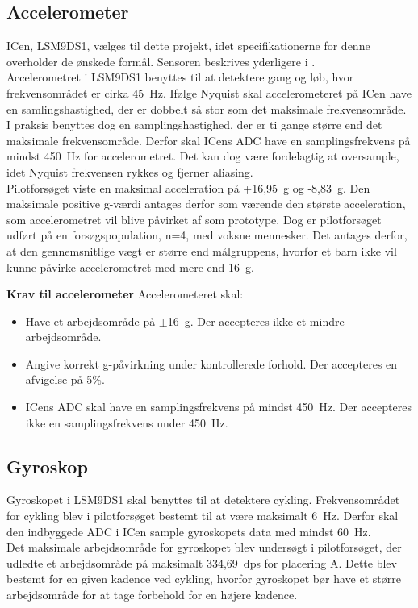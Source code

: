 \subsection{Accelerometer}\label{krav:acc}
ICen, LSM9DS1, vælges til dette projekt, idet specifikationerne for denne overholder de ønskede formål. Sensoren beskrives yderligere i . \\
Accelerometret i LSM9DS1 benyttes til at detektere gang og løb, hvor frekvensområdet er cirka 45~Hz. Ifølge Nyquist skal accelerometeret på ICen have en samlingshastighed, der er dobbelt så stor som det maksimale frekvensområde. I praksis benyttes dog en samplingshastighed, der er ti gange større end det maksimale frekvensområde. Derfor skal ICens ADC have en samplingsfrekvens på mindst 450~Hz for accelerometret. Det kan dog være fordelagtig at oversample, idet Nyquist frekvensen rykkes og fjerner aliasing.~\citep{Webster2011} \\
Pilotforsøget viste en maksimal acceleration på +16,95~g og -8,83~g. Den maksimale positive g-værdi antages derfor som værende den største acceleration, som accelerometret vil blive påvirket af som prototype. Dog er pilotforsøget udført på en forsøgspopulation, n=4, med voksne mennesker. Det antages derfor, at den gennemsnitlige vægt er større end målgruppens, hvorfor et barn ikke vil kunne påvirke accelerometret med mere end 16~g.

\textbf{Krav til accelerometer} \newline 
Accelerometeret skal:
\begin{itemize}
\item Have et arbejdsområde på $\pm$16~g. Der accepteres ikke et mindre arbejdsområde.
\item Angive korrekt g-påvirkning under kontrollerede forhold. Der accepteres en afvigelse på 5\%.
\item ICens ADC skal have en samplingsfrekvens på mindst 450~Hz. Der accepteres ikke en samplingsfrekvens under 450~Hz.
\end{itemize}

\subsection{Gyroskop} \label{krav:gyro}
Gyroskopet i LSM9DS1 skal benyttes til at detektere cykling. Frekvensområdet for cykling blev i pilotforsøget bestemt til at være maksimalt 6~Hz. Derfor skal den indbyggede ADC i ICen sample gyroskopets data med mindst 60~Hz. \\
Det maksimale arbejdsområde for gyroskopet blev undersøgt i pilotforsøget, der udledte et arbejdsområde på maksimalt 334,69~dps for placering A. Dette blev bestemt for en given kadence ved cykling, hvorfor gyroskopet bør have et større arbejdsområde for at tage forbehold for en højere kadence. 

